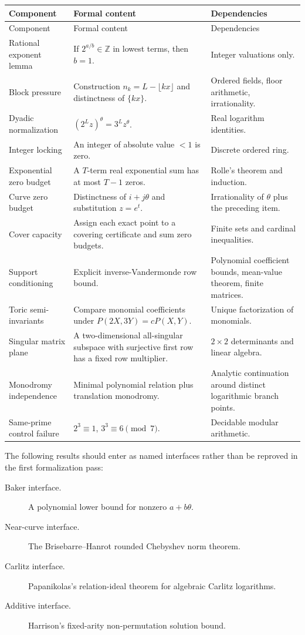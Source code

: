 \documentclass[11pt,oneside]{article}
\theoremstyle{definition}
\theoremstyle{remark}
\newcommand{\Z}{\mathbb Z}
\newcommand{\tht}{\theta}
\begin{document}
\begin{longtable}{L{0.23\textwidth}L{0.30\textwidth}L{0.36\textwidth}}
\toprule
Component & Formal content & Dependencies \\
\midrule
\endfirsthead
\toprule
Component & Formal content & Dependencies \\
\midrule
\endhead
Rational exponent lemma & If $2^{a/b}\in\Z$ in lowest terms, then $b=1$. & Integer valuations only. \\
Block pressure & Construction $n_k=L-\lfloor kx\rfloor$ and distinctness of $\{kx\}$. & Ordered fields, floor arithmetic, irrationality. \\
Dyadic normalization & $(2^Lz)^{\tht}=3^Lz^{\tht}$. & Real logarithm identities. \\
Integer locking & An integer of absolute value $<1$ is zero. & Discrete ordered ring. \\
Exponential zero budget & A $T$-term real exponential sum has at most $T-1$ zeros. & Rolle's theorem and induction. \\
Curve zero budget & Distinctness of $i+j\tht$ and substitution $z=e^t$. & Irrationality of $\tht$ plus the preceding item. \\
Cover capacity & Assign each exact point to a covering certificate and sum zero budgets. & Finite sets and cardinal inequalities. \\
Support conditioning & Explicit inverse-Vandermonde row bound. & Polynomial coefficient bounds, mean-value theorem, finite matrices. \\
Toric semi-invariants & Compare monomial coefficients under $P(2X,3Y)=cP(X,Y)$. & Unique factorization of monomials. \\
Singular matrix plane & A two-dimensional all-singular subspace with surjective first row has a fixed row multiplier. & $2\times2$ determinants and linear algebra. \\
Monodromy independence & Minimal polynomial relation plus translation monodromy. & Analytic continuation around distinct logarithmic branch points. \\
Same-prime control failure & $2^3\equiv1$, $3^3\equiv6\pmod7$. & Decidable modular arithmetic. \\
\bottomrule
\end{longtable}

The following results should enter as named interfaces rather than be reproved in the first
formalization pass:

\begin{description}
\item[Baker interface.] A polynomial lower bound for nonzero $a+b\tht$.
\item[Near-curve interface.] The Brisebarre--Hanrot rounded Chebyshev norm theorem.
\item[Carlitz interface.] Papanikolas's relation-ideal theorem for algebraic Carlitz logarithms.
\item[Additive interface.] Harrison's fixed-arity non-permutation solution bound.
\end{description}
\end{document}
